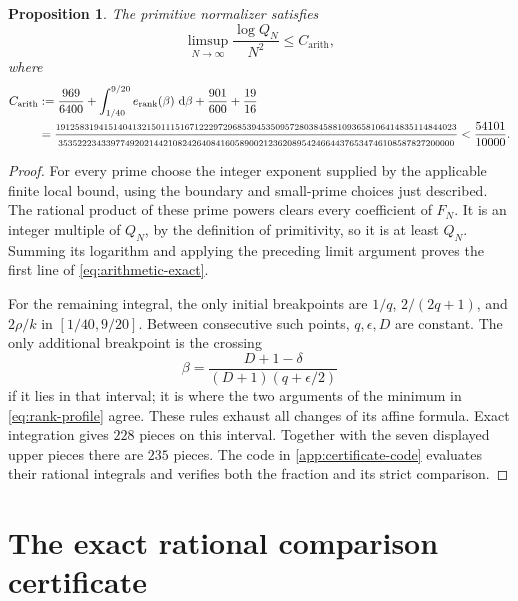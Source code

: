 \documentclass[11pt,letterpaper]{article}
\newtheorem{proposition}[proposition]{Proposition}
\theoremstyle{definition}
\newcommand{\dd}{\,\mathrm d}
\newcommand{\arith}{\mathrm{arith}}
\begin{document}
\begin{proposition}\label{prop:arithmetic-rate}
The primitive normalizer satisfies
\begin{equation}\label{eq:arithmetic-rate}
 \limsup_{N\to\infty}\frac{\log Q_N}{N^2}\le C_{\arith},
\end{equation}
where
\begin{align}
 C_{\arith}
 &:=\frac{969}{6400}
   +\int_{1/40}^{9/20}e_{\mathrm{rank}}(\beta)\,\dd\beta
   +\frac{901}{600}+\frac{19}{16}\notag\\
 &=\frac{\scriptstyle
 191258319415140413215011151671222972968539453509572803845881093658106414835114844023}
 {\scriptstyle
 35352223433977492021442108242640841605890021236208954246644376534746108587827200000}
 <\frac{54101}{10000}.\label{eq:arithmetic-exact}
\end{align}
\end{proposition}
\begin{proof}
For every prime choose the integer exponent supplied by the applicable
finite local bound, using the boundary and small-prime choices just
described. The rational product of these prime powers clears every
coefficient of $F_N$. It is an integer multiple of $Q_N$, by the definition
of primitivity, so it is at least $Q_N$. Summing its logarithm and applying
the preceding limit argument proves the first line of
\eqref{eq:arithmetic-exact}.

For the remaining integral, the only initial breakpoints are
$1/q$, $2/(2q+1)$, and $2\rho/k$ in $[1/40,9/20]$.
Between consecutive such points, $q,\epsilon,D$ are constant. The only
additional breakpoint is the crossing
\[
 \beta=\frac{D+1-\delta}{(D+1)(q+\epsilon/2)}
\]
if it lies in that interval; it is where the two arguments of the minimum
in \eqref{eq:rank-profile} agree. These rules exhaust all changes of its
affine formula. Exact integration gives $228$ pieces on this interval.
Together with the seven displayed upper pieces there are $235$ pieces.
The code in \cref{app:certificate-code} evaluates their rational integrals
and verifies both the fraction and its strict comparison.
\end{proof}


\section{The exact rational comparison certificate}\label{sec:certificate}
\end{document}

